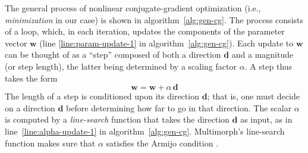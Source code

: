 The general process of nonlinear conjugate-gradient optimization 
(i.e., \emph{minimization} in our case)
is shown in algorithm~\ref{alg:gen-cg}. The process consists of a loop, 
which, in each iteration, updates the components of the parameter 
vector $\textbf{w}$ (line \ref{line:param-update-1} in algorithm~\ref{alg:gen-cg}).
Each update to $\textbf{w}$ can be thought of 
as a ``step'' composed of both a direction $\textbf{d}$ and a magnitude (or step length), 
the latter being determined by a scaling factor $\alpha$. A step thus takes the form
\begin{equation}\label{eq:gen-update}
\textbf{w} = \textbf{w} + \alpha \, \textbf{d}
\end{equation}
The length of a step is conditioned upon its direction $\textbf{d}$; 
that is, one must decide on a direction $\textbf{d}$ before 
determining how far to go in that direction.
The scalar $\alpha$ is computed by a \emph{line-search} function 
that takes the direction $\textbf{d}$
as input, as in line~\ref{line:alpha-update-1} in algorithm~\ref{alg:gen-cg}.
Multimorph's line-search function makes sure that $\alpha$ satisfies the
Armijo condition \citep{armijo:1966}. %

